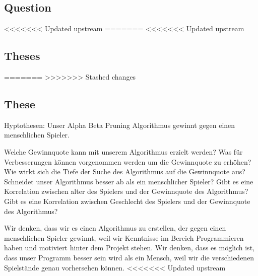 \subsection{Question} %

<<<<<<< Updated upstream
=======
<<<<<<< Updated upstream
\subsection{Theses}
=======
>>>>>>> Stashed changes
\subsection{These}
Hyptothesen:
Unser Alpha Beta Pruning Algorithmus gewinnt gegen einen menschlichen Spieler.

Welche Gewinnquote kann mit unserem Algorithmus erzielt werden?
Was für Verbesserungen können vorgenommen werden um die Gewinnquote zu erhöhen?
Wie wirkt sich die Tiefe der Suche des Algorithmus auf die Gewinnquote aus?
Schneidet unser Algorithmus besser ab als ein menschlicher Spieler?
Gibt es eine Korrelation zwischen alter des Spielers und der Gewinnquote des Algorithmus?
Gibt es eine Korrelation zwischen Geschlecht des Spielers und der Gewinnquote des Algorithmus?

Wir denken, dass wir es  einen Algorithmus zu erstellen, der gegen einen menschlichen Spieler gewinnt, weil wir Kenntnisse im Bereich Programmieren haben und motiviert hinter dem Projekt stehen.
Wir denken, dass es möglich ist, dass unser Programm besser sein wird als ein Mensch, weil wir die verschiedenen Spielstände genau vorhersehen können.
<<<<<<< Updated upstream


